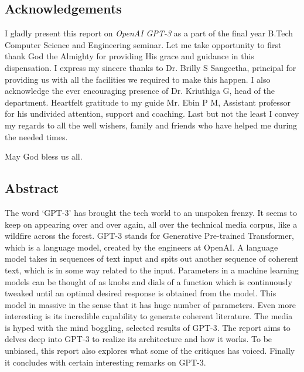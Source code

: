\documentclass[12pt, a4paper]{report}
\begin{document}
\newpage
\vspace*{\fill}
\begin{center}
    \section*{Acknowledgements}
\end{center}

I gladly present this report on \emph{OpenAI GPT-3} as a part of the final year B.Tech Computer Science and Engineering seminar. Let me take opportunity to first thank God the Almighty for providing His grace and guidance in this dispensation.
I express my sincere thanks to Dr. Brilly S Sangeetha, principal for providing us with all the facilities we required to make this happen. I also acknowledge the ever encouraging presence of Dr. Kriuthiga G, head of the department.
Heartfelt gratitude to my guide Mr. Ebin P M, Assistant professor for his undivided attention, support and coaching. Last but not the least I convey my regards to all the well wishers, family and friends who have helped me during the needed times. \\

\begin{center}
    May God bless us all.
\end{center}
\vspace*{\fill}

\newpage
\vspace*{\fill}
\begin{center}
    \section*{Abstract}
\end{center}
The word `GPT-3' has brought the tech world to an unspoken frenzy. It seems to keep on appearing over and over again, all over the technical media corpus, like a wildfire across the forest. GPT-3 stands for Generative Pre-trained Transformer, which is a language model, created by the engineers at OpenAI. A language model takes in sequences of text input and spits out another sequence of coherent text, which is in some way related to the input. Parameters in a machine learning models can be thought of as knobs and dials of a function which is continuously tweaked until an optimal desired response is obtained from the model. This model in massive in the sense that it has huge number of parameters. Even more interesting is its incredible capability to generate coherent literature. The media is hyped with the mind boggling, selected results of GPT-3. The report aims to delves deep into GPT-3 to realize its architecture and how it works. To be unbiased, this report also explores what some of the critiques has voiced. Finally it concludes with certain interesting remarks on GPT-3.
\vspace*{\fill}
\end{document}
